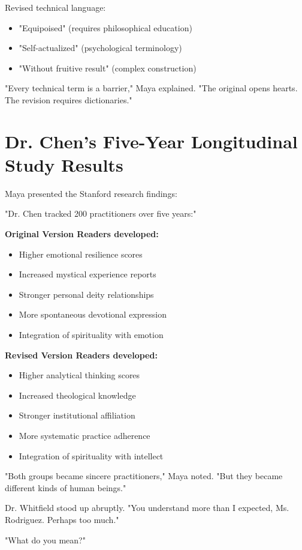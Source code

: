 \documentclass[11pt,twoside]{book}
\begin{document}
Revised technical language:
\begin{itemize}
\item "Equipoised" (requires philosophical education)
\item "Self-actualized" (psychological terminology)
\item "Without fruitive result" (complex construction)
\end{itemize}

"Every technical term is a barrier," Maya explained. "The original opens hearts. The revision requires dictionaries."
\section*{Dr. Chen's Five-Year Longitudinal Study Results}
\label{sec:orgb3dce03}

Maya presented the Stanford research findings:

"Dr. Chen tracked 200 practitioners over five years:"

\textbf{\textbf{Original Version Readers developed:}}
\begin{itemize}
\item Higher emotional resilience scores
\item Increased mystical experience reports
\item Stronger personal deity relationships
\item More spontaneous devotional expression
\item Integration of spirituality with emotion
\end{itemize}

\textbf{\textbf{Revised Version Readers developed:}}
\begin{itemize}
\item Higher analytical thinking scores
\item Increased theological knowledge
\item Stronger institutional affiliation
\item More systematic practice adherence
\item Integration of spirituality with intellect
\end{itemize}

"Both groups became sincere practitioners," Maya noted. "But they became different kinds of human beings."

Dr. Whitfield stood up abruptly. "You understand more than I expected, Ms. Rodriguez. Perhaps too much."

"What do you mean?"
\end{document}
